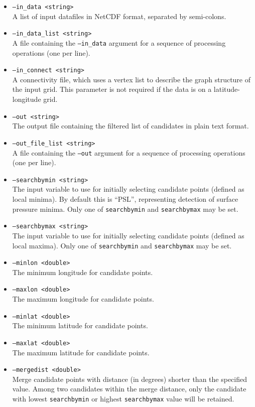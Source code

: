 \documentclass[gmdd, hvmath, online]{copernicus_discussions}
\begin{document}
\begin{itemize}
\item[] \texttt{--in\_data <string>} \\ A list of input datafiles in NetCDF format, separated by semi-colons.
\item[] \texttt{--in\_data\_list <string>} \\ A file containing the \texttt{--in\_data} argument for a sequence of processing operations (one per line).
\item[] \texttt{--in\_connect <string>} \\ A connectivity file, which uses a vertex list to describe the graph structure of the input grid.  This parameter is not required if the data is on a latitude-longitude grid.
\item[] \texttt{--out <string>} \\ The output file containing the filtered list of candidates in plain text format.
\item[] \texttt{--out\_file\_list <string>} \\ A file containing the \texttt{--out} argument for a sequence of processing operations (one per line).
\item[] \texttt{--searchbymin <string>} \\ The input variable to use for initially selecting candidate points (defined as local minima).  By default this is ``PSL'', representing detection of surface pressure minima.  Only one of \texttt{searchbymin} and \texttt{searchbymax} may be set.
\item[] \texttt{--searchbymax <string>} \\ The input variable to use for initially selecting candidate points (defined as local maxima).  Only one of \texttt{searchbymin} and \texttt{searchbymax} may be set.
\item[] \texttt{--minlon <double>} \\ The minimum longitude for candidate points.
\item[] \texttt{--maxlon <double>} \\ The maximum longitude for candidate points.
\item[] \texttt{--minlat <double>} \\ The minimum latitude for candidate points.
\item[] \texttt{--maxlat <double>} \\ The maximum latitude for candidate points.
\item[] \texttt{--mergedist <double>} \\ Merge candidate points with distance (in degrees) shorter than the specified value.  Among two candidates within the merge distance, only the candidate with lowest \texttt{searchbymin} or highest \texttt{searchbymax} value will be retained. 

\end{itemize}
\end{document}
